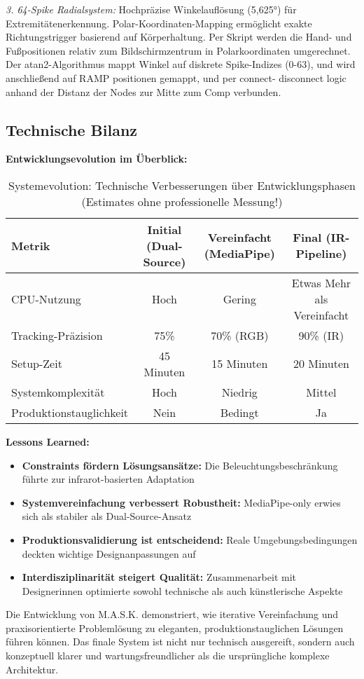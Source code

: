 \textit{3. 64-Spike Radialsystem:}
Hochpräzise Winkelauflösung (5,625°) für Extremitätenerkennung. Polar-Koordinaten-Mapping ermöglicht exakte Richtungstrigger basierend auf Körperhaltung.
Per Skript werden die Hand- und Fußpositionen relativ zum Bildschirmzentrum in Polarkoordinaten umgerechnet. Der atan2-Algorithmus mappt Winkel auf diskrete Spike-Indizes (0-63),
und wird anschließend auf RAMP positionen gemappt, und per connect- disconnect logic anhand der Distanz der Nodes zur Mitte zum Comp verbunden.

\newpage

\subsection{Technische Bilanz}

\textbf{Entwicklungsevolution im Überblick:}
\begin{table}[H]
    \centering
    \begin{tabular}{|l|c|c|c|}
        \hline
        \textbf{Metrik} & \textbf{Initial (Dual-Source)} & \textbf{Vereinfacht (MediaPipe)} & \textbf{Final (IR-Pipeline)} \\ \hline
        CPU-Nutzung & Hoch & Gering & Etwas Mehr als Vereinfacht\\ \hline
        Tracking-Präzision & 75\% & 70\% (RGB) & 90\% (IR) \\ \hline
        Setup-Zeit & 45 Minuten & 15 Minuten & 20 Minuten \\ \hline
        Systemkomplexität & Hoch & Niedrig & Mittel \\ \hline
        Produktionstauglichkeit & Nein & Bedingt & Ja \\ \hline
    \end{tabular}
    \caption{Systemevolution: Technische Verbesserungen über Entwicklungsphasen (Estimates ohne professionelle Messung!)}
    \label{tab:system_evolution}
\end{table}

\textbf{Lessons Learned:}
\begin{itemize}
    \item \textbf{Constraints fördern Lösungsansätze:} Die Beleuchtungsbeschränkung führte zur infrarot-basierten Adaptation
    \item \textbf{Systemvereinfachung verbessert Robustheit:} MediaPipe-only erwies sich als stabiler als Dual-Source-Ansatz
    \item \textbf{Produktionsvalidierung ist entscheidend:} Reale Umgebungsbedingungen deckten wichtige Designanpassungen auf
    \item \textbf{Interdisziplinarität steigert Qualität:} Zusammenarbeit mit Designerinnen optimierte sowohl technische als auch künstlerische Aspekte
\end{itemize}

Die Entwicklung von M.A.S.K. demonstriert, wie iterative Vereinfachung und praxisorientierte Problemlösung zu eleganten, produktionstauglichen Lösungen führen können. Das finale System ist nicht nur technisch ausgereift, sondern auch konzeptuell klarer und wartungsfreundlicher als die ursprüngliche komplexe Architektur.